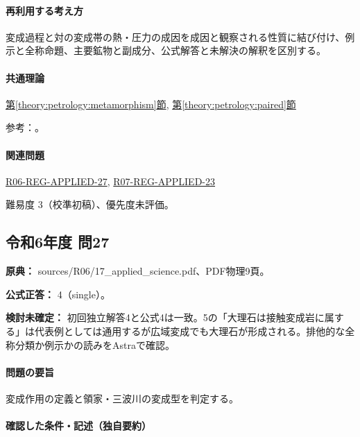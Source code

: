 \paragraph{再利用する考え方} 変成過程と対の変成帯の熱・圧力の成因を成因と観察される性質に結び付け、例示と全称命題、主要鉱物と副成分、公式解答と未解決の解釈を区別する。

\paragraph{共通理論} \hyperref[theory:petrology:metamorphism]{第\ref*{theory:petrology:metamorphism}節}, \hyperref[theory:petrology:paired]{第\ref*{theory:petrology:paired}節}

\par 参考：\cite{aist_awa2021,nelson_contact2011,gsj_metamorphic_words}。

\paragraph{関連問題} \hyperref[q:r06-reg-applied-27]{R06-REG-APPLIED-27}, \hyperref[q:r07-reg-applied-23]{R07-REG-APPLIED-23}

\par 難易度 3（校準初稿）、優先度未評価。

\subsection{令和6年度 問27}
\label{q:r06-reg-applied-27}

\noindent\textbf{原典：} sources/R06/17\_applied\_science.pdf、PDF物理9頁。

\textbf{公式正答：} 4（single）。

\par\textbf{検討未確定：} 初回独立解答4と公式4は一致。5の「大理石は接触変成岩に属する」は代表例としては通用するが広域変成でも大理石が形成される。排他的な全称分類か例示かの読みをAstraで確認。

\paragraph{問題の要旨} 変成作用の定義と領家・三波川の変成型を判定する。

\paragraph{確認した条件・記述（独自要約）}\mbox{}\par

